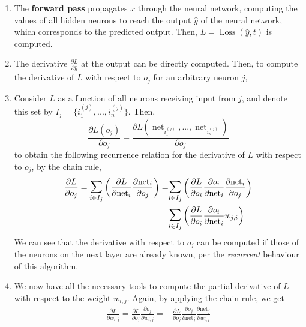 \documentclass{article}
\DeclareMathOperator{\net}{net}
\begin{document}
  \begin{enumerate}
    \item The \textbf{forward pass} propagates $x$ through the neural network, computing the values of all hidden neurons to reach the output $\hat y$ of the neural network, which corresponds to the predicted output. Then, $L = \operatorname{Loss}(\hat y, t)$  is computed.
    \item The derivative $\frac{\partial {L}}{\partial {\hat y}}$ at the output can be directly computed. Then, to compute the derivative of $L$ with respect to $o_j$ for an arbitrary neuron $j$, 

    \item Consider $L$ as a function of all neurons receiving input from $j$, and denote this set by $I_j =\{ i_1^{(j)}, ..., i_n^{(j)}\}$. Then, 
    $$\frac{\partial {L(o_j)}}{\partial {o_j}} = \frac{\partial {L(\net_{i_1^{(j)}}, ..., \net_{i_n^{(j)}})}}{\partial {o_j}} {} $$
    to obtain the following recurrence relation for the derivative of $L$ with respect to $o_j$, by the chain rule, 
    \begin{equation}\label{deriv_o_j}
      \begin{split}
        \frac{\partial {L}}{\partial {o_j}} = \mathlarger{\mathlarger{\sum}}^{}_{i \in I_j} \left( \frac{\partial {L}}{\partial {\net_i}} \frac{\partial {\net_i}}{\partial {o_j}}  \right)  =&  \mathlarger{\mathlarger{\sum}}^{}_{i \in I_j} \left( \frac{\partial {L}}{\partial {o_i}} \frac{\partial {o_i}}{\partial {\net_i}} \frac{\partial {\net_i }}{\partial {o_j}} \right) \\ =&\mathlarger{\mathlarger{\sum}}^{}_{i \in I_j} \left( \frac{\partial {L}}{\partial {o_i}} \frac{\partial {o_i}}{\partial {\net_i}} w_{j,i}\right) 
      \end{split}
    \end{equation}
    We can see that the derivative with respect to $o_j$ can be computed if those of the neurons on the next layer are already known, per the \textit{recurrent} behaviour of this algorithm. 
    \item We now have all the necessary tools to compute the partial derivative of $L$ with respect to the weight $w_{i,j}$. Again, by applying the chain rule, we get
    \begin{equation}\label{deriv_w}
  \begin{split}
    {\frac {\partial L}{\partial w_{i,j}}}={\frac {\partial L}{\partial o_{j}}}{\frac {\partial o_{j}}{\partial w_{i,j}}}=&{\frac {\partial L}{\partial o_{j}}}{\frac {\partial o_{j}}{\partial {\text{net}}_{j}}}{\frac {\partial {\text{net}}_{j}}{\partial w_{i,j}}}\\ 

\end{split}
\end{equation}
\end{enumerate}
\end{document}
